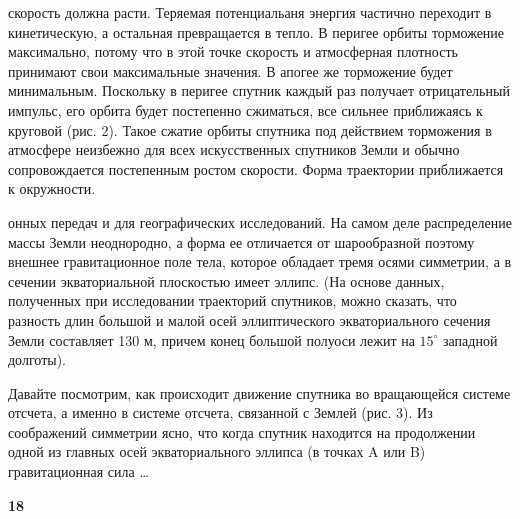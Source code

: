 \begin{multicols}{2}

\setlength{\fboxrule}{0.5pt} %
\setlength{\fboxsep}{8pt} %
        \label{fig:page}
        \vspace{1em}

        \vspace{10px}
        скорость должна расти. Теряемая потенциальаня энергия частично переходит в кинетическую, а остальная превращается в тепло. В перигее орбиты торможение максимально, потому что в этой точке скорость и атмосферная плотность принимают свои максимальные значения. В апогее же торможение будет минимальным. Поскольку в перигее спутник каждый раз получает отрицательный импульс, его орбита будет постепенно сжиматься, все сильнее приближаясь к круговой (рис. 2). Такое сжатие орбиты спутника под действием торможения в атмосфере неизбежно для всех искусственных спутников Земли и обычно сопровождается постепенным ростом скорости. Форма траектории приближается к окружности.
\columnbreak 

онных передач и для географических исследований.
На самом деле распределение массы Земли неоднородно, а форма ее отличается от шарообразной поэтому внешнее гравитационное поле тела, которое обладает тремя осями симметрии, а в сечении экваториальной плоскостью имеет эллипс. (На основе данных, полученных при исследовании траекторий спутников, можно сказать, что разность длин большой и малой осей эллиптического экваториального сечения Земли составляет 130 м, причем конец большой полуоси лежит на $15^\circ$ западной долготы).\par
\hspace{1.5em} Давайте посмотрим, как происходит движение спутника во вращающейся системе отсчета, а именно в системе отсчета, связанной с Землей (рис. 3). Из соображений симметрии ясно, что когда спутник находится на продолжении одной из главных осей экваториального эллипса (в точках A или B) гравитационная сила \dots 
\end{multicols}
\vfill \hfill \textbf{18}
% 